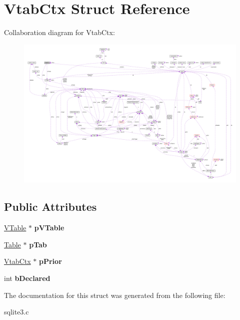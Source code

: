 \hypertarget{structVtabCtx}{}\section{Vtab\+Ctx Struct Reference}
\label{structVtabCtx}


Collaboration diagram for Vtab\+Ctx\+:\nopagebreak
\begin{figure}[H]
\begin{center}
\leavevmode
\includegraphics[width=350pt]{structVtabCtx__coll__graph}
\end{center}
\end{figure}
\subsection*{Public Attributes}
\begin{DoxyCompactItemize}
\item 
\hyperlink{structVTable}{V\+Table} $\ast$ {\bfseries p\+V\+Table}\hypertarget{structVtabCtx_a99bbe533ea0423138d7dddba5aa662b8}{}\label{structVtabCtx_a99bbe533ea0423138d7dddba5aa662b8}

\item 
\hyperlink{structTable}{Table} $\ast$ {\bfseries p\+Tab}\hypertarget{structVtabCtx_a4040cb18a83afebad0ad7e7f20572b09}{}\label{structVtabCtx_a4040cb18a83afebad0ad7e7f20572b09}

\item 
\hyperlink{structVtabCtx}{Vtab\+Ctx} $\ast$ {\bfseries p\+Prior}\hypertarget{structVtabCtx_a0100b21d6b04d3b7565f1315b9008385}{}\label{structVtabCtx_a0100b21d6b04d3b7565f1315b9008385}

\item 
int {\bfseries b\+Declared}\hypertarget{structVtabCtx_a3e4936f41e9dc9a8ee37f35b9aec90d8}{}\label{structVtabCtx_a3e4936f41e9dc9a8ee37f35b9aec90d8}

\end{DoxyCompactItemize}


The documentation for this struct was generated from the following file\+:\begin{DoxyCompactItemize}
\item 
sqlite3.\+c\end{DoxyCompactItemize}

